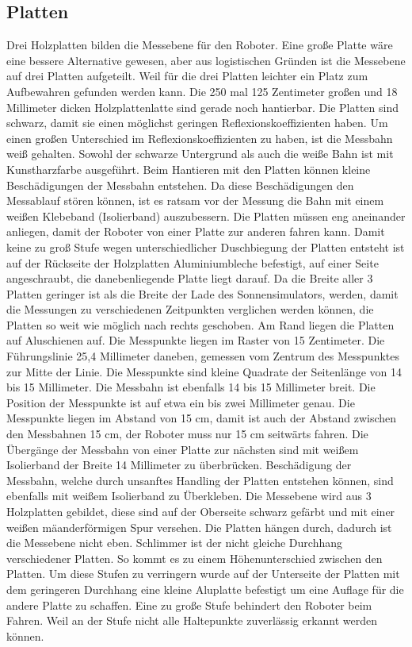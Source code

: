 \documentclass[a4paper,bibtotoc,oneside]{scrbook}
\begin{document}
  \subsection{Platten}\thispagestyle{empty}
Drei Holzplatten bilden die Messebene für den Roboter. Eine große Platte wäre eine bessere Alternative gewesen, aber aus logistischen Gründen ist die Messebene auf drei Platten aufgeteilt. Weil für die drei Platten leichter ein Platz zum Aufbewahren gefunden werden kann. Die 250 mal 125 Zentimeter großen und 18 Millimeter dicken Holzplattenlatte sind gerade noch hantierbar. 
Die Platten sind schwarz, damit sie einen möglichst geringen Reflexionskoeffizienten haben. Um einen großen Unterschied im Reflexionskoeffizienten zu haben, ist die Messbahn weiß gehalten. Sowohl der schwarze Untergrund als auch die weiße Bahn ist mit Kunstharzfarbe ausgeführt. Beim Hantieren mit den Platten können kleine Beschädigungen der Messbahn entstehen. Da diese Beschädigungen  den Messablauf stören können, ist es ratsam vor der Messung die Bahn mit einem weißen Klebeband (Isolierband) auszubessern.
Die Platten müssen eng aneinander anliegen, damit der Roboter von einer Platte zur anderen fahren kann. Damit keine zu groß Stufe wegen unterschiedlicher Duschbiegung der Platten entsteht ist auf der Rückseite der Holzplatten Aluminiumbleche befestigt, auf einer Seite angeschraubt, die danebenliegende Platte liegt darauf.
Da die Breite aller 3 Platten geringer ist als die Breite der Lade des Sonnensimulators, werden, damit die Messungen zu verschiedenen Zeitpunkten verglichen werden können, die Platten so weit wie möglich nach rechts geschoben. Am Rand liegen die Platten auf Aluschienen auf.
Die Messpunkte liegen im Raster von 15 Zentimeter. Die Führungslinie 25,4 Millimeter daneben, gemessen vom Zentrum des Messpunktes zur Mitte der Linie. Die Messpunkte sind kleine Quadrate der Seitenlänge von 14 bis 15 Millimeter. Die Messbahn ist ebenfalls 14 bis 15 Millimeter breit. Die Position der Messpunkte ist auf etwa ein bis zwei Millimeter genau.
Die Messpunkte liegen im Abstand von 15 cm, damit ist auch der Abstand zwischen den Messbahnen 15 cm, der Roboter muss nur 15 cm seitwärts fahren. Die Übergänge der Messbahn von einer Platte zur nächsten sind mit weißem Isolierband  der Breite 14 Millimeter zu überbrücken. Beschädigung der Messbahn, welche durch unsanftes Handling der Platten entstehen können, sind ebenfalls mit weißem Isolierband zu Überkleben.
Die Messebene wird aus 3 Holzplatten gebildet, diese sind auf der Oberseite schwarz gefärbt und mit einer weißen mäanderförmigen Spur versehen. Die Platten hängen durch, dadurch ist die Messebene nicht eben. Schlimmer ist der nicht gleiche Durchhang verschiedener Platten. So kommt es zu einem Höhenunterschied zwischen den Platten. Um diese Stufen zu verringern wurde auf der Unterseite der Platten mit dem geringeren Durchhang eine kleine Aluplatte befestigt um eine Auflage für die andere Platte zu schaffen. Eine zu große Stufe behindert den Roboter beim Fahren. Weil an der Stufe nicht alle Haltepunkte zuverlässig erkannt werden können.
\end{document}
